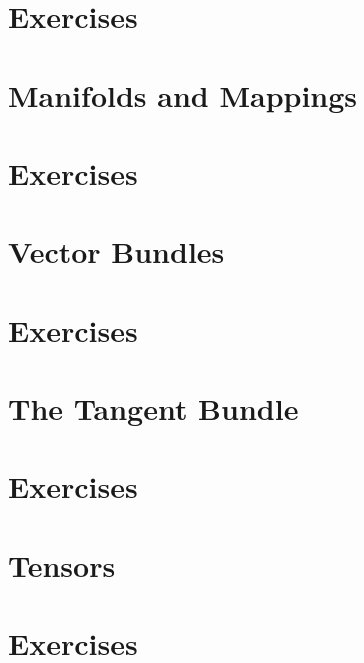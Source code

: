 \section*{Exercises}
\section{Manifolds and Mappings}
\section*{Exercises}
\section{Vector Bundles}
\section*{Exercises}
\section{The Tangent Bundle}
\section*{Exercises}
\section{Tensors}
\section*{Exercises}